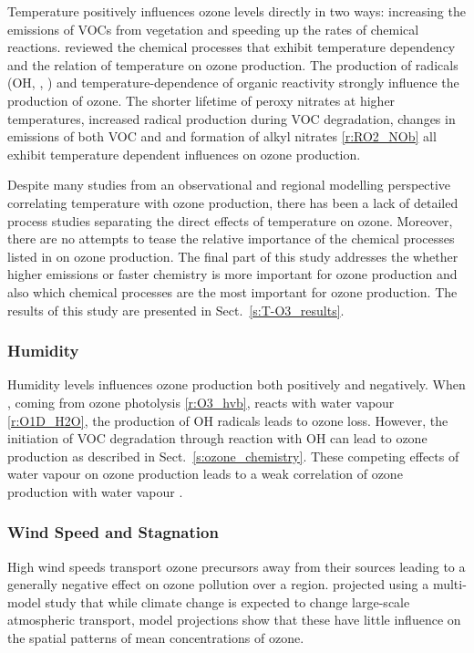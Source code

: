 Temperature positively influences ozone levels directly in two ways: increasing the emissions of VOCs from vegetation and speeding up the rates of chemical reactions.
\citet{Pusede:2015} reviewed the chemical processes that exhibit temperature dependency and the relation of temperature on ozone production.
The production of radicals (OH, , ) and temperature-dependence of organic reactivity strongly influence the production of ozone.
The shorter lifetime of peroxy nitrates at higher temperatures, increased radical production during VOC degradation, changes in emissions of both VOC and  and formation of alkyl nitrates \eqref{r:RO2_NOb} all exhibit temperature dependent influences on ozone production.

Despite many studies from an observational and regional modelling perspective correlating temperature with ozone production, there has been a lack of detailed process studies separating the direct effects of temperature on ozone.
Moreover, there are no attempts to tease the relative importance of the chemical processes listed in \citet{Pusede:2015} on ozone production.
The final part of this study addresses the whether higher emissions or faster chemistry is more important for ozone production and also which chemical processes are the most important for ozone production.
The results of this study are presented in Sect.~\ref{s:T-O3_results}.

\subsubsection{Humidity}
Humidity levels influences ozone production both positively and negatively.
When , coming from ozone photolysis \eqref{r:O3_hvb}, reacts with water vapour \eqref{r:O1D_H2O}, the production of OH radicals leads to ozone loss.
However, the initiation of VOC degradation through reaction with OH can lead to ozone production as described in Sect.~\ref{s:ozone_chemistry}.
These competing effects of water vapour on ozone production leads to a weak correlation of ozone production with water vapour \citep{Jacob:2009}.

\subsubsection{Wind Speed and Stagnation}
High wind speeds transport ozone precursors away from their sources leading to a generally negative effect on ozone pollution over a region.
\citet{Doherty:2013} projected using a multi-model study that while climate change is expected to change large-scale atmospheric transport, model projections show that these have little influence on the spatial patterns of mean concentrations of ozone.

